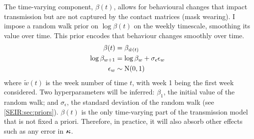 \documentclass[thesis.tex]{subfiles}
\begin{document}
The time-varying component, $\beta(t)$, allows for behavioural changes that impact transmission but are not captured by the contact matrices (\eg mask wearing).
I impose a random walk prior on $\log\beta(t)$ on the weekly timescale, smoothing its value over time.
This prior encodes that behaviour changes smoothly over time.
\begin{align}
    \beta(t) &= \beta_{\tilde{w}(t)} \\
    \log\beta_{w+1} &= \log\beta_w + \sigma_\epsilon \epsilon_w \\
    \epsilon_w &\sim \operatorname{N}(0, 1)
\end{align}
where $\tilde{w}(t)$ is the week number of time $t$, with week 1 being the first week considered.
Two hyperparameters will be inferred: $\beta_1$, the initial value of the random walk; and $\sigma_\epsilon$, the standard deviation of the random walk (see \cref{SEIR:sec:priors}).
$\beta(t)$ is the only time-varying part of the transmission model that is not fixed a priori.
Therefore, in practice, it will also absorb other effects such as any error in $\bm{\kappa}$.


\end{document}
